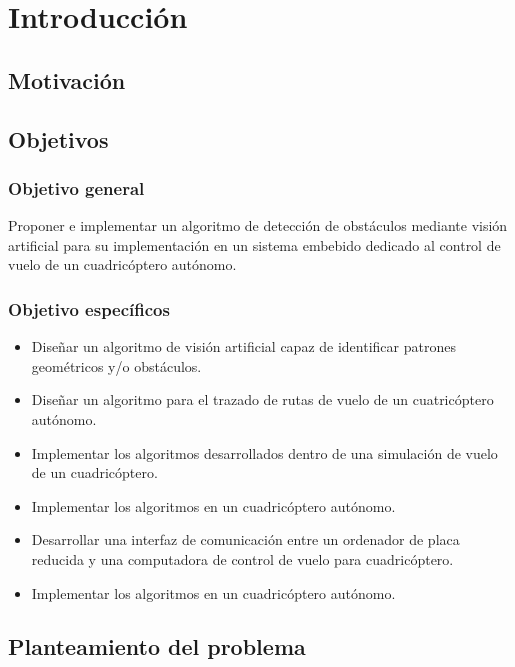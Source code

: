 \chapter{Introducción}

\section{Motivación}



\section{Objetivos}
\subsection{Objetivo general}

Proponer e implementar un algoritmo de detección de obstáculos mediante visión artificial para su implementación en un sistema embebido dedicado al control de vuelo de un cuadricóptero autónomo.

\subsection{Objetivo específicos}

\begin{itemize}
    \item Diseñar un algoritmo de visión artificial capaz de identificar patrones geométricos y/o obstáculos.
    \item Diseñar un algoritmo para el trazado de rutas de vuelo de un cuatricóptero autónomo.
    \item Implementar los algoritmos desarrollados dentro de una simulación de vuelo de un cuadricóptero.
    \item Implementar los algoritmos en un cuadricóptero autónomo.
    \item Desarrollar una interfaz de comunicación entre un ordenador de placa reducida y una computadora de control de vuelo para cuadricóptero.
    \item Implementar los algoritmos en un cuadricóptero autónomo.
\end{itemize}



\section{Planteamiento del problema}


